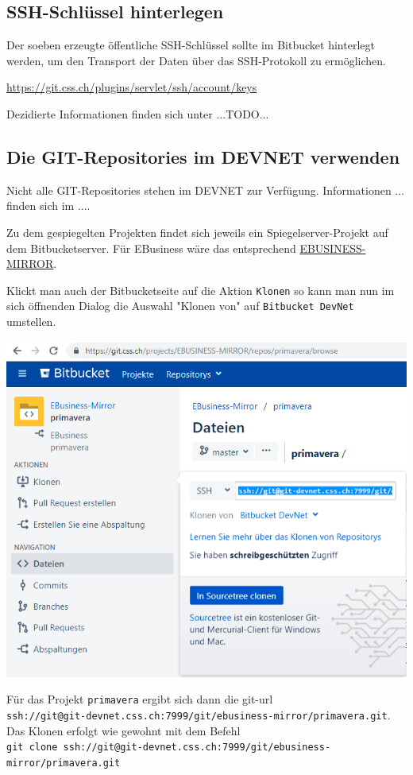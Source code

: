 \documentclass[]{article}
\newcommand{\code}[1]{\texttt{#1}}
\begin{document}
\subsection{SSH-Schlüssel hinterlegen}
Der soeben erzeugte öffentliche SSH-Schlüssel sollte im Bitbucket hinterlegt werden, um den Transport der Daten über das SSH-Protokoll zu ermöglichen.

\href{https://git.css.ch/plugins/servlet/ssh/account/keys}{https://git.css.ch/plugins/servlet/ssh/account/keys}

Dezidierte Informationen finden sich unter ...TODO...

\subsection{Die GIT-Repositories im DEVNET verwenden}
Nicht alle GIT-Repositories stehen im DEVNET zur Verfügung. Informationen ... finden sich im ....

Zu dem gespiegelten Projekten findet sich jeweils ein Spiegelserver-Projekt auf dem Bitbucketserver. 
Für EBusiness wäre das entsprechend \href{https://git.css.ch/projects/EBUSINESS-MIRROR}{EBUSINESS-MIRROR}.

Klickt man auch der Bitbucketseite auf die Aktion \code{Klonen} so kann man nun im sich öffnenden Dialog die Auswahl "Klonen von" auf \code{Bitbucket DevNet} umstellen.

\includegraphics[scale=0.3]{assets/clone.png}

Für das Projekt \code{primavera} ergibt sich dann die git-url \\
\code{ssh://git@git-devnet.css.ch:7999/git/ebusiness-mirror/primavera.git}. Das Klonen erfolgt wie gewohnt mit dem Befehl \\
\code{git clone ssh://git@git-devnet.css.ch:7999/git/ebusiness-mirror/primavera.git}
\end{document}
